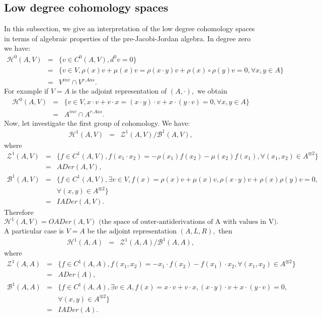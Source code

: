 \documentclass[12pt]{amsart}
\begin{document}
	\subsection{Low degree cohomology spaces}
	In this subsection, we give an interpretation of the low degree cohomology spaces in terms of
	algebraic properties of the pre-Jacobi-Jordan algebra. In degree zero we have:
	\begin{eqnarray}
		\mathcal{H}^{0}(A,V)&=&\{v\in C^0(A,V), d^0v=0\}\nonumber\\
		&=&\{v\in V,\rho(x)v+\mu(x)v =\rho(x\cdot y)v+\rho(x)\circ\rho(y)v=0, \forall x,y\in A\} \nonumber\\
		&=&V^{inv}\cap V^{r.Aas}.\nonumber
	\end{eqnarray}
	For example if $V=A$ is the adjoint representation of $(A,\cdot),$ we obtain
	\begin{eqnarray}
		\mathcal{H}^{0}(A,V)
		&=& \{v\in V,x\cdot v+v\cdot x =(x\cdot y)\cdot v+x\cdot(y\cdot v)=0, \forall x,y\in A\}\nonumber\\
		&=&A^{inv}\cap A^{r.Aas}.\nonumber
	\end{eqnarray}
	Now, let investigate the first group of cohomology. We have:
	\begin{eqnarray}
		\mathcal{H}^{1}(A,V)&=&\mathcal{Z}^{1}(A,V)/\mathcal{B}^{1}(A,V),
	\end{eqnarray}
	where
	\begin{eqnarray}
		\mathcal{Z}^{1}(A,V)&=&\{f\in C^1(A,V), f(x_1\cdot x_2)=-\rho(x_1)f(x_2)-\mu(x_2)f(x_1), \forall (x_1,x_2)\in A^{\otimes 2}\}\nonumber\\
		&=& ADer(A,V),\nonumber\\
		\mathcal{B}^{1}(A,V)&=& \{f\in C^1(A,V), \exists v\in V, f(x)=\rho(x)v+\mu(x)v, 
		\rho(x\cdot y)v+\rho(x)\rho(y)v=0,\nonumber\\ 
		&& \forall (x,y)\in A^{\otimes 2}\}\nonumber\\
		&=&IADer(A,V).\nonumber
	\end{eqnarray}
	Therefore $$\mathcal{H}^{1}(A,V)=OADer(A,V) \mbox{  (the space of outer-antiderivations of A with values in V).}$$
	A particular case is $V=A$ be the adjoint representation $(A,L, R),$ then
	\begin{eqnarray}
		\mathcal{H}^{1}(A,A)&=&\mathcal{Z}^{1}(A,A)/\mathcal{B}^{1}(A,A),
	\end{eqnarray}
	where
	\begin{eqnarray}
		\mathcal{Z}^{1}(A,A)&=&\{f\in C^1(A,A), f(x_1,x_2)=-x_1\cdot f(x_2)-f(x_1)\cdot x_2, \forall (x_1,x_2)\in A^{\otimes 2}\}\nonumber\\
		&=& ADer(A),\nonumber\\
		\mathcal{B}^{1}(A,A)&=& \{f\in C^1(A,A), \exists v\in A, f(x)=x\cdot v+v\cdot x, 
		(x\cdot y)\cdot v+x\cdot(y\cdot v)=0,\nonumber\\ 
		&& \forall (x,y)\in A^{\otimes 2}\}\nonumber\\
		&=&IADer(A).\nonumber
	\end{eqnarray}
\end{document}

